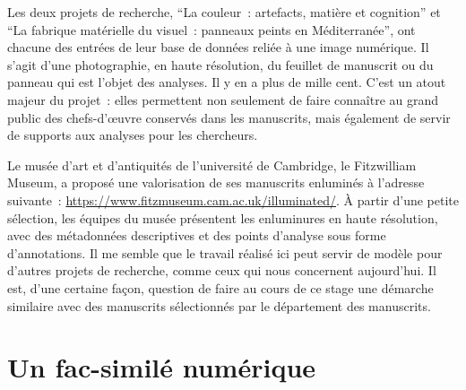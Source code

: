 Les deux projets de recherche, \enquote{La couleur~: artefacts, matière et cognition} et \enquote{La fabrique matérielle du visuel~: panneaux peints en Méditerranée}, ont chacune des entrées de leur base de données reliée à une image numérique. Il s'agit d'une photographie, en haute résolution, du feuillet de manuscrit ou du panneau qui est l'objet des analyses. Il y en a plus de mille cent. C'est un atout majeur du projet~: elles permettent non seulement de faire connaître au grand public des chefs-d'œuvre conservés dans les manuscrits, mais également de servir de supports aux analyses pour les chercheurs.\par
Le musée d’art et d'antiquités de l'université de Cambridge, le Fitzwilliam Museum, a proposé une valorisation de ses manuscrits enluminés à l'adresse suivante~: \url{https://www.fitzmuseum.cam.ac.uk/illuminated/}. À partir d'une petite sélection, les équipes du musée présentent les enluminures en haute résolution, avec des métadonnées descriptives et des points d'analyse sous forme d'annotations. Il me semble que le travail réalisé ici peut servir de modèle pour d'autres projets de recherche, comme ceux qui nous concernent aujourd'hui. Il est, d'une certaine façon, question de faire au cours de ce stage une démarche similaire avec des manuscrits sélectionnés par le département des manuscrits.\newpage

\section{Un fac-similé numérique}

